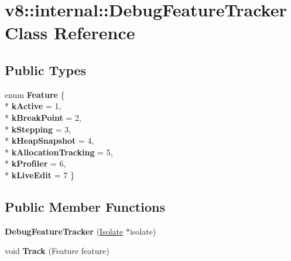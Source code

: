 \hypertarget{classv8_1_1internal_1_1_debug_feature_tracker}{}\section{v8\+:\+:internal\+:\+:Debug\+Feature\+Tracker Class Reference}
\label{classv8_1_1internal_1_1_debug_feature_tracker}
\subsection*{Public Types}
\begin{DoxyCompactItemize}
\item 
enum {\bfseries Feature} \{ \\*
{\bfseries k\+Active} = 1, 
\\*
{\bfseries k\+Break\+Point} = 2, 
\\*
{\bfseries k\+Stepping} = 3, 
\\*
{\bfseries k\+Heap\+Snapshot} = 4, 
\\*
{\bfseries k\+Allocation\+Tracking} = 5, 
\\*
{\bfseries k\+Profiler} = 6, 
\\*
{\bfseries k\+Live\+Edit} = 7
 \}\hypertarget{classv8_1_1internal_1_1_debug_feature_tracker_aba2ecbdea37741ea461e4714d937af5e}{}\label{classv8_1_1internal_1_1_debug_feature_tracker_aba2ecbdea37741ea461e4714d937af5e}

\end{DoxyCompactItemize}
\subsection*{Public Member Functions}
\begin{DoxyCompactItemize}
\item 
{\bfseries Debug\+Feature\+Tracker} (\hyperlink{classv8_1_1internal_1_1_isolate}{Isolate} $\ast$isolate)\hypertarget{classv8_1_1internal_1_1_debug_feature_tracker_afdaf2c05935442f7fce8be32ce16b2ee}{}\label{classv8_1_1internal_1_1_debug_feature_tracker_afdaf2c05935442f7fce8be32ce16b2ee}

\item 
void {\bfseries Track} (Feature feature)\hypertarget{classv8_1_1internal_1_1_debug_feature_tracker_a16745e8377f94a9b4cc9609b2d8d13bd}{}\label{classv8_1_1internal_1_1_debug_feature_tracker_a16745e8377f94a9b4cc9609b2d8d13bd}

\end{DoxyCompactItemize}
